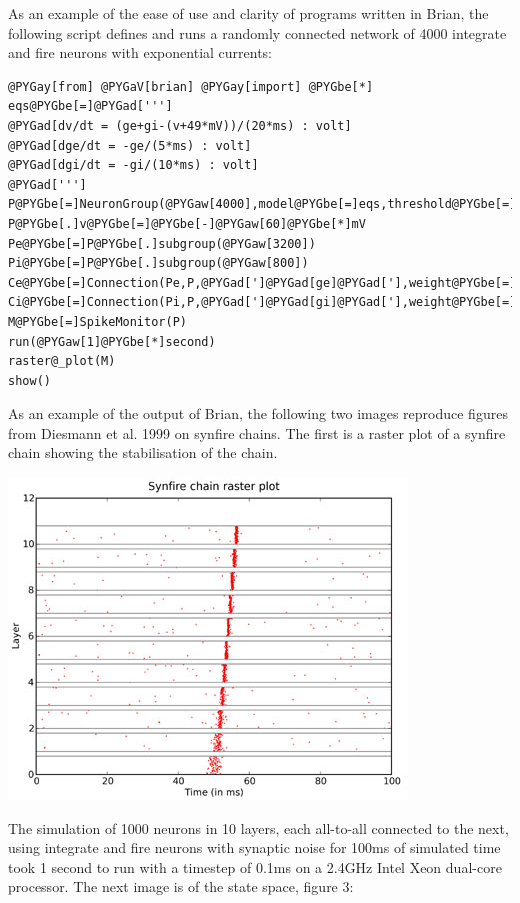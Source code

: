 \documentclass[letterpaper,10pt,english]{manual}
\begin{document}
As an example of the ease of use and clarity of programs written in Brian, the following script defines
and runs a randomly connected network of 4000 integrate and fire neurons with exponential currents:

\begin{Verbatim}[commandchars=@\[\]]
@PYGay[from] @PYGaV[brian] @PYGay[import] @PYGbe[*]
eqs@PYGbe[=]@PYGad[''']
@PYGad[dv/dt = (ge+gi-(v+49*mV))/(20*ms) : volt]
@PYGad[dge/dt = -ge/(5*ms) : volt]
@PYGad[dgi/dt = -gi/(10*ms) : volt]
@PYGad[''']
P@PYGbe[=]NeuronGroup(@PYGaw[4000],model@PYGbe[=]eqs,threshold@PYGbe[=]@PYGbe[-]@PYGaw[50]@PYGbe[*]mV,reset@PYGbe[=]@PYGbe[-]@PYGaw[60]@PYGbe[*]mV)
P@PYGbe[.]v@PYGbe[=]@PYGbe[-]@PYGaw[60]@PYGbe[*]mV
Pe@PYGbe[=]P@PYGbe[.]subgroup(@PYGaw[3200])
Pi@PYGbe[=]P@PYGbe[.]subgroup(@PYGaw[800])
Ce@PYGbe[=]Connection(Pe,P,@PYGad[']@PYGad[ge]@PYGad['],weight@PYGbe[=]@PYGaw[1.62]@PYGbe[*]mV,sparseness@PYGbe[=]@PYGaw[0.02])
Ci@PYGbe[=]Connection(Pi,P,@PYGad[']@PYGad[gi]@PYGad['],weight@PYGbe[=]@PYGbe[-]@PYGaw[9]@PYGbe[*]mV,sparseness@PYGbe[=]@PYGaw[0.02])
M@PYGbe[=]SpikeMonitor(P)
run(@PYGaw[1]@PYGbe[*]second)
raster@_plot(M)
show()
\end{Verbatim}

As an example of the output of Brian, the following two images reproduce figures from Diesmann et al. 1999
on synfire chains. The first is a raster plot of a synfire chain showing the stabilisation of the chain.

\includegraphics{synfirechain-example.jpg}

The simulation of 1000 neurons in 10 layers, each all-to-all connected to the next, using integrate and fire
neurons with synaptic noise for 100ms of simulated time took 1 second to run with a timestep of 0.1ms on a
2.4GHz Intel Xeon dual-core processor. The next image is of the state space, figure 3:
\end{document}
